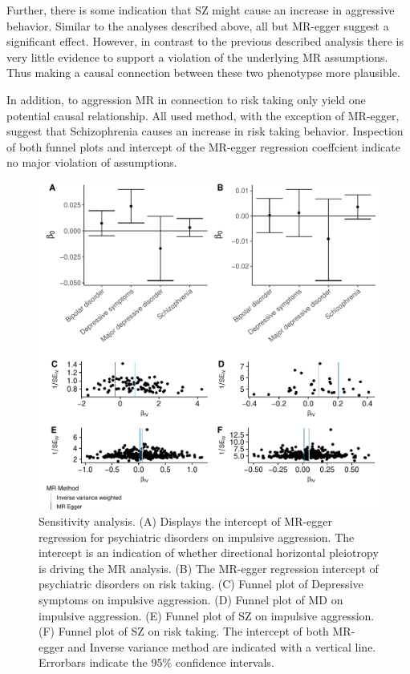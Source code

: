 Further, there is some indication that SZ might cause an increase in aggressive behavior.
Similar to the analyses described above, all but MR-egger suggest a significant effect. 
However, in contrast to the previous described analysis there is very little evidence to support a violation of the underlying MR assumptions.
Thus making a causal connection between these two phenotypse more plausible.

In addition, to aggression MR in connection to risk taking only yield one potential causal relationship.
All used method, with the exception of MR-egger, suggest that Schizophrenia causes an increase in risk taking behavior.
Inspection of both funnel plots and intercept of the MR-egger regression coeffcient indicate no major violation of assumptions.


\begin{figure}[htpb]
  \centering
  \includegraphics[width=0.9\linewidth]{figures/sensitvity_plot.pdf}
  \caption{Sensitivity analysis.
    (A) Displays the intercept of MR-egger regression for psychiatric disorders on impulsive aggression. The intercept is an indication of whether directional horizontal pleiotropy is driving the MR analysis.
    (B) The MR-egger regression intercept of psychiatric disorders on risk taking.
    (C) Funnel plot of Depressive symptoms on impulsive aggression. 
    (D) Funnel plot of MD on impulsive aggression. 
    (E) Funnel plot of SZ on impulsive aggression. 
    (F) Funnel plot of SZ on risk taking. 
    The intercept of both MR-egger and Inverse variance method are indicated with a vertical line.
    Errorbars indicate the 95\% confidence intervals.
  }\label{fig:sensitivity}
\end{figure}
